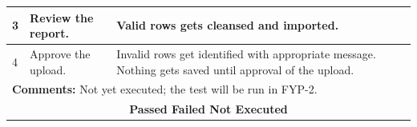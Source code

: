 \documentclass{StockSense}
\begin{document}
\begin{table}[!htbp]
{\begin{tabular}{|p{}|p{}|p{}|p{}|}
3 & Review the report. & \multicolumn{2}{p{\dimexpr0.42\textwidth+2\tabcolsep\relax}|}{Valid rows gets cleansed and imported.} \\ \hline
4 & Approve the upload. & \multicolumn{2}{p{\dimexpr0.42\textwidth+2\tabcolsep\relax}|}{Invalid rows get identified with appropriate message. Nothing gets saved until approval of the upload.} \\ \hline
\multicolumn{4}{|l|}{\textbf{Comments:} Not yet executed; the test will be run in FYP-2.} \\ \hline
\multicolumn{4}{|c|}{\textbf{Passed \quad Failed \quad Not Executed}} \\ \hline
\end{tabular}\par}
\end{table}
\end{document}
